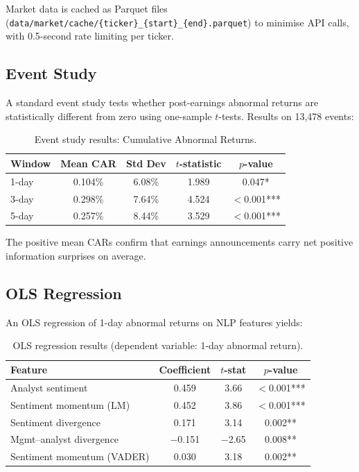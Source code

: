 \documentclass[12pt,a4paper]{article}
\begin{document}
Market data is cached as Parquet files (\texttt{data/market/cache/\{ticker\}\_\{start\}\_\{end\}.parquet}) to minimise API calls, with 0.5-second rate limiting per ticker.

\subsection{Event Study}

A standard event study tests whether post-earnings abnormal returns are statistically different from zero using one-sample $t$-tests. Results on 13,478 events:

\begin{table}[H]
\centering
\caption{Event study results: Cumulative Abnormal Returns.}
\label{tab:event-study}
\begin{tabular}{@{}lcccc@{}}
\toprule
\textbf{Window} & \textbf{Mean CAR} & \textbf{Std Dev} & \textbf{$t$-statistic} & \textbf{$p$-value} \\
\midrule
1-day & 0.104\% & 6.08\% & 1.989 & 0.047* \\
3-day & 0.298\% & 7.64\% & 4.524 & $<$0.001*** \\
5-day & 0.257\% & 8.44\% & 3.529 & $<$0.001*** \\
\bottomrule
\end{tabular}
\end{table}

The positive mean CARs confirm that earnings announcements carry net positive information surprises on average.

\subsection{OLS Regression}

An OLS regression of 1-day abnormal returns on NLP features yields:

\begin{table}[H]
\centering
\caption{OLS regression results (dependent variable: 1-day abnormal return).}
\label{tab:ols}
\small
\begin{tabular}{@{}lccc@{}}
\toprule
\textbf{Feature} & \textbf{Coefficient} & \textbf{$t$-stat} & \textbf{$p$-value} \\
\midrule
Analyst sentiment & 0.459 & 3.66 & $<$0.001*** \\
Sentiment momentum (LM) & 0.452 & 3.86 & $<$0.001*** \\
Sentiment divergence & 0.171 & 3.14 & 0.002** \\
Mgmt--analyst divergence & $-$0.151 & $-$2.65 & 0.008** \\
Sentiment momentum (VADER) & 0.030 & 3.18 & 0.002** \\
\bottomrule
\end{tabular}
\end{table}
\end{document}
